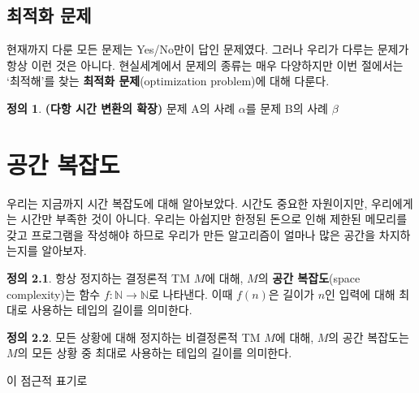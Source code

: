 \documentclass[b5paper]{book}
\theoremstyle{definition}
\newtheorem{defn}{정의}[chapter]
\begin{document}
\section{최적화 문제}
현재까지 다룬 모든 문제는 Yes/No만이 답인 문제였다. 그러나 우리가 다루는 문제가 항상 이런 것은 아니다. 
현실세계에서 문제의 종류는 매우 다양하지만 
이번 절에서는 `최적해'를 찾는 \textbf{최적화 문제}(optimization problem)에 대해 다룬다.
\begin{defn}
    \textbf{(다항 시간 변환의 확장)} 문제 A의 사례 $\alpha$를 문제 B의 사례 $\beta$
\end{defn} 
\chapter{공간 복잡도}
우리는 지금까지 시간 복잡도에 대해 알아보았다. 시간도 중요한 자원이지만, 우리에게는 시간만 부족한 것이 아니다.
우리는 아쉽지만 한정된 돈으로 인해 제한된 메모리를 갖고 프로그램을 작성해야 하므로 우리가 만든 알고리즘이 얼마나
많은 공간을 차지하는지를 알아보자.
\begin{defn}
    항상 정지하는 결정론적 TM $M$에 대해, $M$의 \textbf{공간 복잡도}(space complexity)는
    함수 $f: \mathbb{N} \rightarrow \mathbb{N}$로 나타낸다. 이때 $f(n)$은 길이가 $n$인 입력에
    대해 최대로 사용하는 테입의 길이를 의미한다. 
\end{defn}
\begin{defn}
    모든 상황에 대해 정지하는 비결정론적 TM $M$에 대해, $M$의 공간 복잡도는 $M$의 모든 상황 중
    최대로 사용하는 테입의 길이를 의미한다.
\end{defn}
이 점근적 표기로 


\nocite{*}
\end{document}
